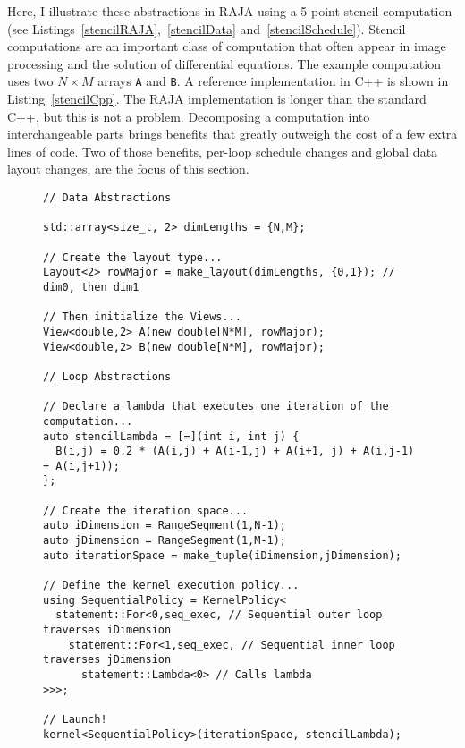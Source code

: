 Here, I illustrate these abstractions in RAJA using a 5-point stencil computation (see Listings~\ref{stencilRAJA},~\ref{stencilData} and~\ref{stencilSchedule}).
Stencil computations are an important class of computation that often appear in image processing and the solution of differential equations.
The example computation uses two $N \times M$ arrays \verb.A. and \verb.B..
A reference implementation in C++ is shown in Listing~\ref{stencilCpp}.
The RAJA implementation is longer than the standard C++, but this is not a problem.
Decomposing a computation into interchangeable parts brings benefits that greatly outweigh the cost of a few extra lines of code.
Two of those benefits, per-loop schedule changes and global data layout changes, are the focus of this section.

\begin{figure}
\begin{lstlisting}[caption={Data declaration using RAJA multi-dimensional data abstractions, called Views, followed by the description of a 5-point stencil kernel. Data is initialized to use row-major storage.}, label=stencilRAJA]
// Data Abstractions

std::array<size_t, 2> dimLengths = {N,M};

// Create the layout type...
Layout<2> rowMajor = make_layout(dimLengths, {0,1}); // dim0, then dim1

// Then initialize the Views...
View<double,2> A(new double[N*M], rowMajor); 
View<double,2> B(new double[N*M], rowMajor);

// Loop Abstractions

// Declare a lambda that executes one iteration of the computation...
auto stencilLambda = [=](int i, int j) {
  B(i,j) = 0.2 * (A(i,j) + A(i-1,j) + A(i+1, j) + A(i,j-1) + A(i,j+1));
};

// Create the iteration space...
auto iDimension = RangeSegment(1,N-1);
auto jDimension = RangeSegment(1,M-1);
auto iterationSpace = make_tuple(iDimension,jDimension);

// Define the kernel execution policy...
using SequentialPolicy = KernelPolicy<
  statement::For<0,seq_exec, // Sequential outer loop traverses iDimension
    statement::For<1,seq_exec, // Sequential inner loop traverses jDimension
      statement::Lambda<0> // Calls lambda
>>>;

// Launch!
kernel<SequentialPolicy>(iterationSpace, stencilLambda);
\end{lstlisting}
\end{figure}



